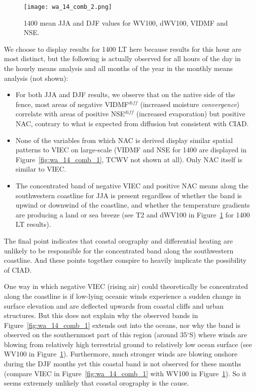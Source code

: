 \begin{figure}[!ht]
	\centering
	\texttt{[image: wa\_14\_comb\_2.png]}
	\caption[WA 1400 means for selected variables 2]{1400 mean \acs{JJA} and \acs{DJF} values for \acs{WV100}, \acs{dWV100}, \acs{VIDMF} and \acs{NSE}.}
	\label{fig:wa_14_comb_2}
\end{figure}

We choose to display results for 1400 \ac{LT} here because results for this hour are most distinct, but the following is actually observed for all hours of the day in the hourly means analysis and all months of the year in the monthly means analysis (not shown):
\begin{itemize}
	\item For both \ac{JJA} and \ac{DJF} results, we observe that on the native side of the fence, most areas of negative \ac{VIDMF}$^{diff}$ (increased moisture \textit{convergence}) correlate with areas of positive \ac{NSE}$^{diff}$ (increased evaporation) but positive \ac{NAC}, contrary to what is expected from diffusion but consistent with \ac{CIAD}.
	\item None of the variables from which \ac{NAC} is derived display similar spatial patterns to \ac{VIEC} on large-scale (\ac{VIDMF} and \ac{NSE} for 1400 are displayed in Figure~\ref{fig:wa_14_comb_1}, \ac{TCWV} not shown at all). Only \ac{NAC} itself is similar to \ac{VIEC}.
	\item The concentrated band of negative \ac{VIEC} and positive \ac{NAC} means along the southwestern coastline for \ac{JJA} is present regardless of whether the band is upwind or downwind of the coastline, and whether the temperature gradients are producing a land or sea breeze (see \ac{T2} and \ac{dWV100} in Figure~\ref{fig:wa_14_comb_2} for 1400 \ac{LT} results).
\end{itemize}

The final point indicates that coastal orography and differential heating are unlikely to be responsible for the concentrated band along the southwestern coastline. And these points together conspire to heavily implicate the possibility of \ac{CIAD}.

One way in which negative \ac{VIEC} (rising air) could theoretically be concentrated along the coastline is if low-lying oceanic winds experience a sudden change in surface elevation and are deflected upwards from coastal cliffs and urban structures. But this does not explain why the observed bands in Figure~\ref{fig:wa_14_comb_1} extends out into the oceans, nor why the band is observed on the southernmost part of this region (around 35$^\circ$S) where winds are blowing from relatively high terrestrial ground to relatively low ocean surface (see \ac{WV100} in Figure~\ref{fig:wa_14_comb_2}). Furthermore, much stronger winds are blowing onshore during the \ac{DJF} months yet this coastal band is not observed for these months (compare \ac{VIEC} in Figure~\ref{fig:wa_14_comb_1} with \ac{WV100} in Figure~\ref{fig:wa_14_comb_2}). So it seems extremely unlikely that coastal orography is the cause.

